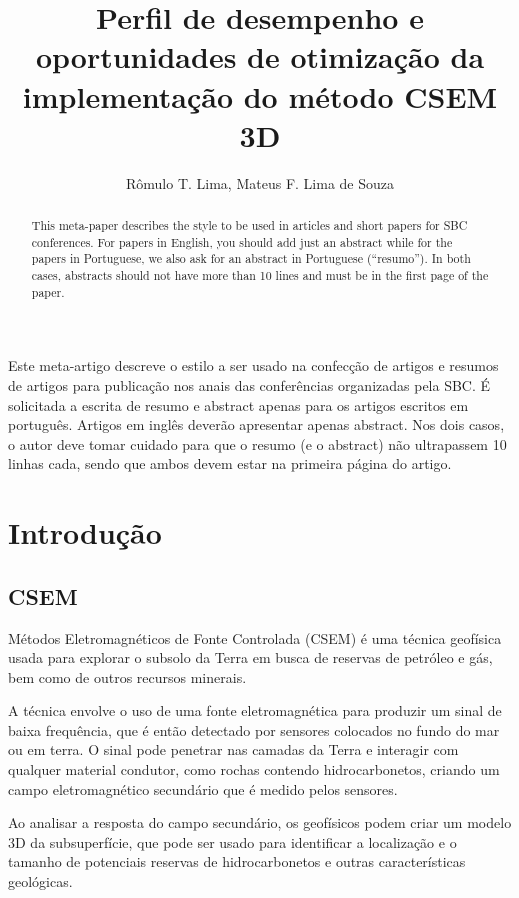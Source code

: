 \documentclass[12pt]{article}
\title{Perfil de desempenho e oportunidades de otimização da implementação do método CSEM 3D}
\author{Rômulo T. Lima\inst{1,2}, Mateus F. Lima de Souza\inst{1,3}}
\begin{document}
 

\maketitle

\begin{abstract}
  This meta-paper describes the style to be used in articles and short papers
  for SBC conferences. For papers in English, you should add just an abstract
  while for the papers in Portuguese, we also ask for an abstract in
  Portuguese (``resumo''). In both cases, abstracts should not have more than
  10 lines and must be in the first page of the paper.
\end{abstract}
     
\begin{resumo} 
  Este meta-artigo descreve o estilo a ser usado na confecção de artigos e
  resumos de artigos para publicação nos anais das conferências organizadas
  pela SBC. É solicitada a escrita de resumo e abstract apenas para os artigos
  escritos em português. Artigos em inglês deverão apresentar apenas abstract.
  Nos dois casos, o autor deve tomar cuidado para que o resumo (e o abstract)
  não ultrapassem 10 linhas cada, sendo que ambos devem estar na primeira
  página do artigo.
\end{resumo}


\section{Introdução}

\subsection{CSEM} \label{sec:firstpage}
Métodos Eletromagnéticos de Fonte Controlada (CSEM) é uma técnica geofísica usada para explorar o subsolo da Terra em busca de reservas de petróleo e gás, bem como de outros recursos minerais.

A técnica envolve o uso de uma fonte eletromagnética para produzir um sinal de baixa frequência, que é então detectado por sensores colocados no fundo do mar ou em terra. O sinal pode penetrar nas camadas da Terra e interagir com qualquer material condutor, como rochas contendo hidrocarbonetos, criando um campo eletromagnético secundário que é medido pelos sensores.

Ao analisar a resposta do campo secundário, os geofísicos podem criar um modelo 3D da subsuperfície, que pode ser usado para identificar a localização e o tamanho de potenciais reservas de hidrocarbonetos e outras características geológicas.
\end{document}
